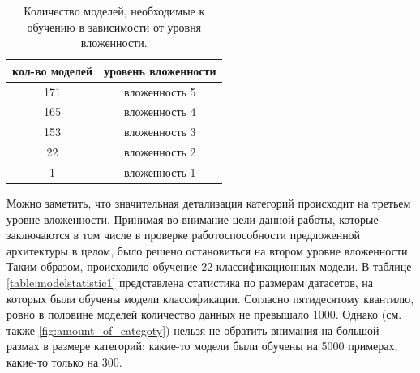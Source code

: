 \documentclass[a4paper,12pt]{extarticle}
\begin{document}
\begin{table}[ht]
	\caption{Количество моделей, необходимые к обучению в зависимости от уровня вложенности.}
	\label{table:amount-models}
	\footnotesize
	\centering
	\begin{tabular}{cc}
		\toprule
		\multicolumn{1}{c}{кол-во моделей} & \multicolumn{1}{c}{уровень вложенности}\\
		\midrule
		171 & вложенность 5\\
		165 & вложенность 4\\
		153 & вложенность 3\\
		22  & вложенность 2\\
		1   & вложенность 1\\
		\bottomrule
	\end{tabular}
\end{table}

Можно заметить, что значительная детализация категорий происходит на третьем уровне вложенности. Принимая во внимание цели данной работы, которые заключаются в том числе в проверке работоспособности предложенной архитектуры в целом, было решено остановиться на втором уровне вложенности. Таким образом, происходило обучение 22 классификационных модели. В таблице \ref{table:modelstatistic1} представлена статистика по размерам датасетов, на которых были обучены модели классификации. Согласно пятидесятому квантилю, ровно в половине моделей количество данных не превышало 1000. Однако (см. также \ref{fig:amount_of_categoty}) нельзя не обратить внимания на большой размах в размере категорий: какие-то модели были обучены на 5000 примерах, какие-то только на 300.
\end{document}
